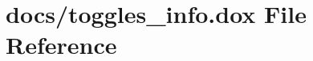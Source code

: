 \hypertarget{toggles__info_8dox}{}\section{docs/toggles\+\_\+info.dox File Reference}
\label{toggles__info_8dox}
